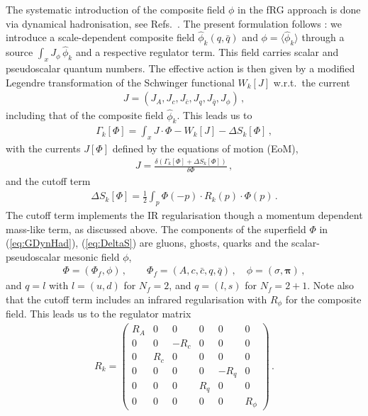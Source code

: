 \documentclass[%
reprint,
superscriptaddress,
showpacs,preprintnumbers,
 amsmath,amssymb,
 aps,
prd,
]{revtex4-1}
\def\eq#1{(\ref{#1})}
\begin{document}
The systematic introduction of the composite field $\phi$ in the fRG
approach is done via dynamical hadronisation, see
Refs.~\cite{Gies:2001nw, Gies:2002hq, Pawlowski:2005xe,
  Floerchinger:2009uf}.  The present formulation follows
\cite{Pawlowski:2005xe, Braun:2014ata, Mitter:2014wpa, Cyrol:2017ewj}:
we introduce a scale-dependent composite field $\hat\phi_k(q,\bar q)$
and $\phi=\langle \hat\phi_k\rangle$ through a source
$\int_x\! J_\phi \,\hat\phi_k$ and a respective regulator term. This
field carries scalar and pseudoscalar quantum numbers. The effective
action is then given by a modified Legendre transformation of the
Schwinger functional $W_k[J]$ w.r.t.\ the current
%
\begin{align}\label{eq:J}
  J=(J_A, J_c,J_{\bar c}, J_q,J_{\bar q},J_\phi)\,,
\end{align}
%
including that of the
composite field $\hat\phi_k$. This leads us to 
%
\begin{align}\label{eq:GDynHad}
  \Gamma_k[\Phi]=  \int_x J \cdot \Phi - W_k[J]  -
  \Delta S_k[\Phi]
  \,,  
\end{align}
%
with the currents $J[\Phi]$ defined by the equations of motion (EoM),
%
\begin{align}\label{eq:EoMJ}
  J= \frac{\delta\left(\Gamma_k[\Phi]+\Delta
  S_k[\Phi]\right)}{\delta\Phi}\,,  
\end{align}
%
and the cutoff term
% 
\begin{align}\label{eq:DeltaS}
  \Delta S_k[\Phi]=\frac12 \int_p \Phi(-p) \cdot R_k(p)\cdot
  \Phi(p)\,.
\end{align}
%
The cutoff term implements the IR regularisation though a momentum
dependent mass-like term, as discussed above.  The components of the
superfield $\Phi$ in \eq{eq:GDynHad}, \eq{eq:DeltaS} are gluons,
ghosts, quarks and the scalar-pseudoscalar mesonic field $\phi$,
%
\begin{align}\label{eq:PhiQCD}
  \Phi=(\Phi_{f}, \phi)\,,\qquad  \Phi_{f}=(A,c,\bar c,q,\bar q)\,,\quad
  \phi=(\sigma, \bm\pi)\,, 
\end{align}
%
and $q=l$ with $l=(u,d)$ for $N_f=2$, and $q=(l,s)$ for
$N_f=2+1$. Note also that the cutoff term includes an infrared
regularisation with $R_\phi$ for the composite field. This leads us to
the regulator matrix
%
\begin{align}
  R_k= \begin{pmatrix}
    R_{A} & 0 & 0& 0 & 0& 0\\[1ex]
    0 & 0 & -R_c & 0 & 0& 0\\[1ex]
    0 & R_c  &  0  & 0 & 0& 0\\[1ex]
      0 & 0 & 0  & 0 & -R_q& 0\\[1ex]
      0 & 0 & 0 & R_q & 0 & 0\\[1ex]
 0 & 0 & 0 & 0 & 0      & R_\phi
\end{pmatrix}\,.
\label{eq:QCD-RegulatorMatrix}\end{align}
\end{document}
